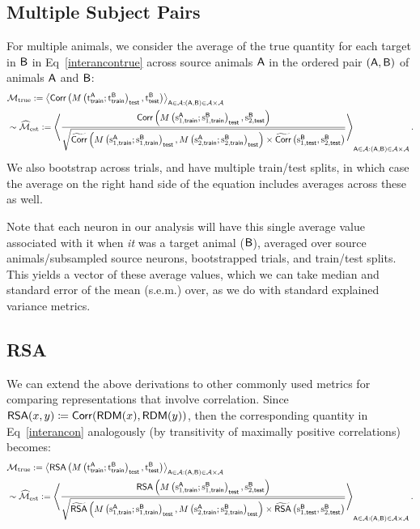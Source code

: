 \subsection{Multiple Subject Pairs}
\label{ss:methods-interanimal-multiple}
For multiple animals, we consider the average of the true quantity for each target in $\animalB$ in Eq~\eqref{interancontrue} across source animals $\animalA$ in the ordered pair $(\animalA,\animalB)$ of animals $\animalA$ and $\animalB$:
\begin{equation*}\label{multipleinterancon}
\begin{split}
&\Mtrue := \left\langle \corr\left(M\left(\trueA;\trueB\right)_{\test}, \trueBtest\right)\right\rangle_{\animalA \in \mathcal{A}: (\animalA,\animalB)\in \mathcal{A}\times\mathcal{A}} \\
& \sim \Mest := \left\langle\dfrac{\corr\left(M\left(\sfAtrain;\sfBtrain\right)_{\test}, \ssBtest\right)}{\sqrt{\widetilde{\corr}\left(M\left(\sfAtrain;\sfBtrain\right)_{\test}, M\left(\ssAtrain;\ssBtrain\right)_{\test}\right) \times \widetilde{\corr}\left(\sfBtest, \ssBtest\right)}}\right\rangle_{\animalA \in \mathcal{A}: (\animalA,\animalB)\in \mathcal{A}\times\mathcal{A}}.
\end{split}
\end{equation*}
We also bootstrap across trials, and have multiple train/test splits, in which case the average on the right hand side of the equation includes averages across these as well.

Note that each neuron in our analysis will have this single average value associated with it when \emph{it} was a target animal ($\animalB$), averaged over source animals/subsampled source neurons, bootstrapped trials, and train/test splits.
This yields a vector of these average values, which we can take median and standard error of the mean (s.e.m.) over, as we do with standard explained variance metrics.

\subsection{RSA}
\label{ss:methods-interanimal-rsa}
We can extend the above derivations to other commonly used metrics for comparing representations that involve correlation.
Since $\rsa(x,y) \coloneqq \corr(\rdm(x), \rdm(y))$, then the corresponding quantity in Eq~\eqref{interancon} analogously (by transitivity of maximally positive correlations) becomes:
\begin{equation}\label{rsainterancon}
\begin{split}
&\Mtrue := \left\langle\rsa\left(M\left(\trueA;\trueB\right)_{\test}, \trueBtest\right)\right\rangle_{\animalA \in \mathcal{A}: (\animalA,\animalB)\in \mathcal{A}\times\mathcal{A}} \\
& \sim \Mest := \left\langle\dfrac{\rsa\left(M\left(\sfAtrain;\sfBtrain\right)_{\test}, \ssBtest\right)}{\sqrt{\widetilde{\rsa}\left(M\left(\sfAtrain;\sfBtrain\right)_{\test}, M\left(\ssAtrain;\ssBtrain\right)_{\test}\right) \times \widetilde{\rsa}\left(\sfBtest, \ssBtest\right)}}\right\rangle_{\animalA \in \mathcal{A}: (\animalA,\animalB)\in \mathcal{A}\times\mathcal{A}}.
\end{split}
\end{equation}

